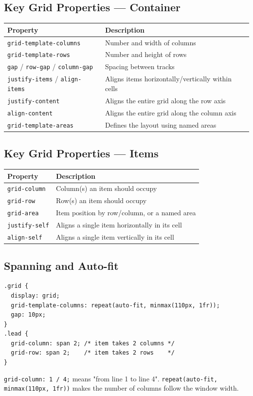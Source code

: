 \documentclass[12pt]{article}
\begin{document}
\subsection{Key Grid Properties — Container}
\begin{center}
\begin{tabular}{ll}
\textbf{Property} & \textbf{Description} \\
\hline
\texttt{grid-template-columns} & Number and width of columns \\
\texttt{grid-template-rows} & Number and height of rows \\
\texttt{gap} / \texttt{row-gap} / \texttt{column-gap} & Spacing between tracks \\
\texttt{justify-items} / \texttt{align-items} & Aligns items horizontally/vertically within cells \\
\texttt{justify-content} & Aligns the entire grid along the row axis \\
\texttt{align-content} & Aligns the entire grid along the column axis \\
\texttt{grid-template-areas} & Defines the layout using named areas \\
\end{tabular}
\end{center}

\subsection{Key Grid Properties — Items}
\begin{center}
\begin{tabular}{ll}
\textbf{Property} & \textbf{Description} \\
\hline
\texttt{grid-column} & Column(s) an item should occupy \\
\texttt{grid-row} & Row(s) an item should occupy \\
\texttt{grid-area} & Item position by row/column, or a named area \\
\texttt{justify-self} & Aligns a single item horizontally in its cell \\
\texttt{align-self} & Aligns a single item vertically in its cell \\
\end{tabular}
\end{center}

\subsection{Spanning and Auto-fit}
\begin{lstlisting}
.grid {
  display: grid;
  grid-template-columns: repeat(auto-fit, minmax(110px, 1fr));
  gap: 10px;
}
.lead {
  grid-column: span 2; /* item takes 2 columns */
  grid-row: span 2;    /* item takes 2 rows    */
}
\end{lstlisting}
\texttt{grid-column: 1 / 4;} means "from line 1 to line 4". \texttt{repeat(auto-fit, minmax(110px, 1fr))} makes the number of columns follow the window width.
\end{document}
